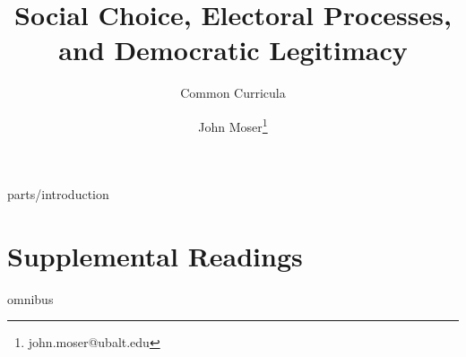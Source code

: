 \documentclass[twoside,titlepage,12pt,appendixprefix=true]{scrbook}
\begin{document}
    \author{John Moser\thanks{john.moser@ubalt.edu}}

    \title{Social Choice, Electoral Processes, and Democratic Legitimacy}
    \subtitle{Common Curricula}
    \maketitle[0]
    \frontmatter
    \tableofcontents
     {parts/introduction}
    \mainmatter
    
    \backmatter
    \part{Supplemental Readings}
    \appendix
    {omnibus}
    \printbibliography[title=Bibliography,heading=bibintoc]
\end{document}
